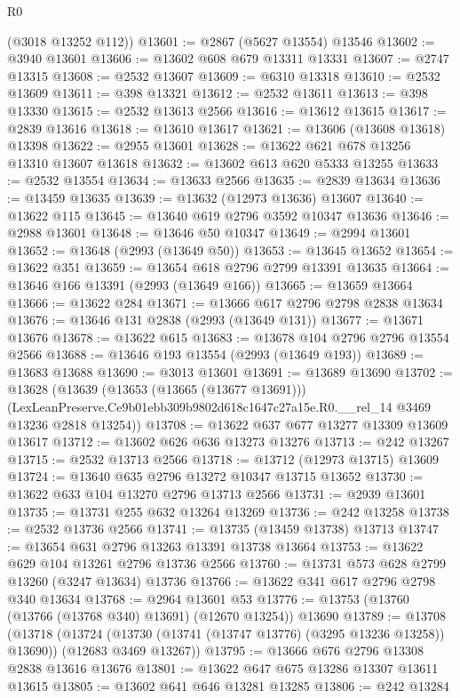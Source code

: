 \begin{lexlean}{R0}
\begin{coremodule}
      (@3018 @13252 @112))
@13601 := @2867 (@5627 @13554) @13546
@13602 := @3940 @13601
@13606 := @13602 @608 @679 @13311 @13331
@13607 := @2747 @13315
@13608 := @2532 @13607
@13609 := @6310 @13318
@13610 := @2532 @13609
@13611 := @398 @13321
@13612 := @2532 @13611
@13613 := @398 @13330
@13615 := @2532 @13613 @2566
@13616 := @13612 @13615
@13617 := @2839 @13616
@13618 := @13610 @13617
@13621 := @13606 (@13608 @13618) @13398
@13622 := @2955 @13601
@13628 := @13622 @621 @678 @13256 @13310 @13607 @13618
@13632 := @13602 @613 @620 @5333 @13255
@13633 := @2532 @13554
@13634 := @13633 @2566
@13635 := @2839 @13634
@13636 := @13459 @13635
@13639 := @13632 (@12973 @13636) @13607
@13640 := @13622 @115
@13645 := @13640 @619 @2796 @3592 @10347 @13636
@13646 := @2988 @13601
@13648 := @13646 @50 @10347
@13649 := @2994 @13601
@13652 := @13648 (@2993 (@13649 @50))
@13653 := @13645 @13652
@13654 := @13622 @351
@13659 := @13654 @618 @2796 @2799 @13391 @13635
@13664 := @13646 @166 @13391 (@2993 (@13649 @166))
@13665 := @13659 @13664
@13666 := @13622 @284
@13671 := @13666 @617 @2796 @2798 @2838 @13634
@13676 := @13646 @131 @2838 (@2993 (@13649 @131))
@13677 := @13671 @13676
@13678 := @13622 @615
@13683 := @13678 @104 @2796 @2796 @13554 @2566
@13688 := @13646 @193 @13554 (@2993 (@13649 @193))
@13689 := @13683 @13688
@13690 := @3013 @13601
@13691 := @13689 @13690
@13702 := @13628
    (@13639
      (@13653 (@13665 (@13677 @13691)))
      (LexLeanPreserve.Ce9b01ebb309b9802d618c1647c27a15e.R0.__rel_14 @3469 @13236 @2818 @13254))
@13708 := @13622 @637 @677 @13277 @13309 @13609 @13617
@13712 := @13602 @626 @636 @13273 @13276
@13713 := @242 @13267
@13715 := @2532 @13713 @2566
@13718 := @13712 (@12973 @13715) @13609
@13724 := @13640 @635 @2796 @13272 @10347 @13715 @13652
@13730 := @13622 @633 @104 @13270 @2796 @13713 @2566
@13731 := @2939 @13601
@13735 := @13731 @255 @632 @13264 @13269
@13736 := @242 @13258
@13738 := @2532 @13736 @2566
@13741 := @13735 (@13459 @13738) @13713
@13747 := @13654 @631 @2796 @13263 @13391 @13738 @13664
@13753 := @13622 @629 @104 @13261 @2796 @13736 @2566
@13760 := @13731 @573 @628 @2799 @13260 (@3247 @13634) @13736
@13766 := @13622 @341 @617 @2796 @2798 @340 @13634
@13768 := @2964 @13601 @53
@13776 := @13753 (@13760 (@13766 (@13768 @340) @13691) (@12670 @13254)) @13690
@13789 := @13708
    (@13718
      (@13724 (@13730 (@13741 (@13747 @13776) (@3295 @13236 @13258)) @13690))
      (@12683 @3469 @13267))
@13795 := @13666 @676 @2796 @13308 @2838 @13616 @13676
@13801 := @13622 @647 @675 @13286 @13307 @13611 @13615
@13805 := @13602 @641 @646 @13281 @13285
@13806 := @242 @13284

\end{coremodule}
\end{lexlean}
